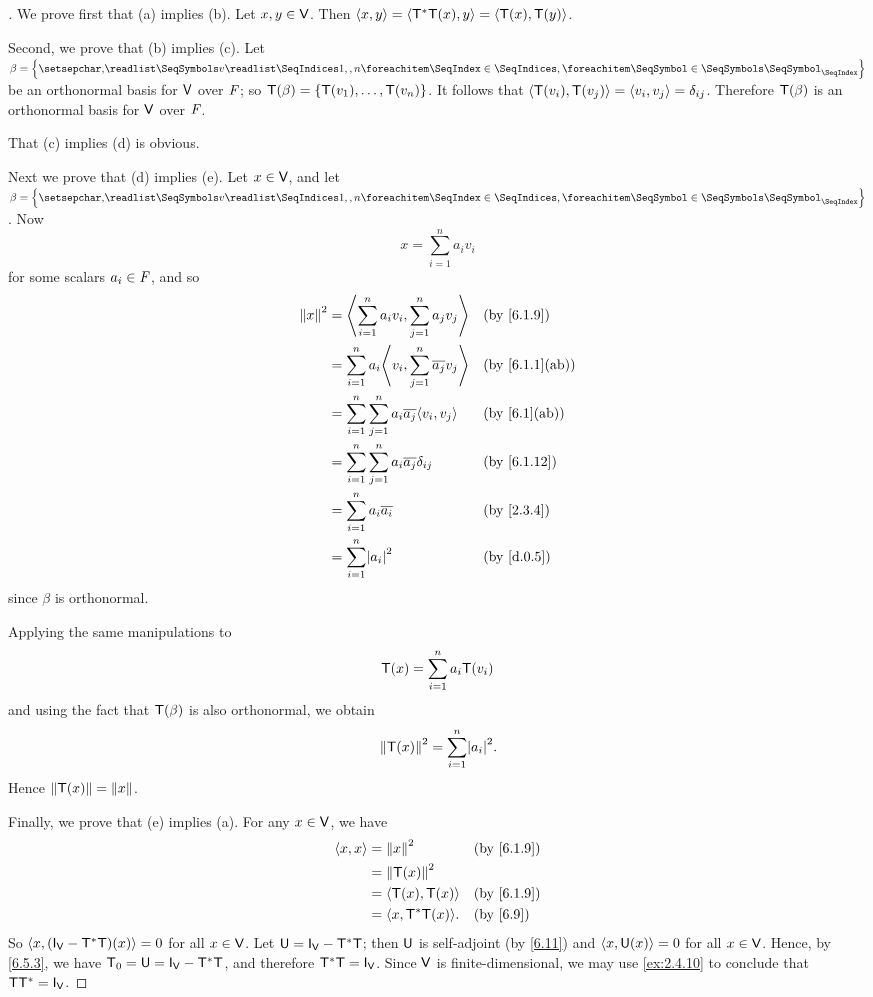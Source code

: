\begin{proof}[]
	We prove first that (a) implies (b).
	Let \(x, y \in \mathsf{V}\).
	Then \(\left\langle x, y\right\rangle = \left\langle\mathsf{T}^* \mathsf{T}(x), y\right\rangle = \left\langle\mathsf{T}(x), \mathsf{T}(y)\right\rangle\).

	Second, we prove that (b) implies (c).
	Let \(\beta = \set{\seq{v}{1,,n}}\) be an orthonormal basis for \(\mathsf{V}\) over \(\mathit{F}\);
	so \(\mathsf{T}(\beta) = \left\lbrace\mathsf{T}(v_1), \dots, \mathsf{T}(v_n)\right\rbrace\).
	It follows that \(\left\langle\mathsf{T}(v_i), \mathsf{T}(v_j)\right\rangle = \left\langle v_i, v_j\right\rangle = \delta_{i j}\).
	Therefore \(\mathsf{T}(\beta)\) is an orthonormal basis for \(\mathsf{V}\) over \(\mathit{F}\).

	That (c) implies (d) is obvious.

	Next we prove that (d) implies (e).
	Let \(x \in \mathsf{V}\), and let \(\beta = \set{\seq{v}{1,,n}}\).
	Now
	\[
		x = \sum_{i = 1}^n a_i v_i
	\]
	for some scalars \(a_i \in \mathit{F}\), and so
	\begin{align*}
		\norm{x}^2 & = \inn{\sum_{i = 1}^n a_i v_i, \sum_{j = 1}^n a_j v_j}         &  & \by{6.1.9}     \\
		           & = \sum_{i = 1}^n  a_i \inn{v_i, \sum_{j = 1}^n \conj{a_j} v_j} &  & \by{6.1.1}[ab] \\
		           & = \sum_{i = 1}^n \sum_{j = 1}^n a_i \conj{a_j} \inn{v_i, v_j}  &  & \by{6.1}[ab]   \\
		           & = \sum_{i = 1}^n \sum_{j = 1}^n a_i \conj{a_j} \delta_{i j}    &  & \by{6.1.12}    \\
		           & = \sum_{i = 1}^n a_i \conj{a_i}                                &  & \by{2.3.4}     \\
		           & = \sum_{i = 1}^n \abs{a_i}^2                                   &  & \by{d.0.5}
	\end{align*}
	since \(\beta\) is orthonormal.

	Applying the same manipulations to
	\[
		\mathsf{T}(x) = \sum_{i = 1}^n a_i \mathsf{T}(v_i)
	\]
	and using the fact that \(\mathsf{T}(\beta)\) is also orthonormal, we obtain
	\[
		\norm{\T(x)}^2 = \sum_{i = 1}^n \abs{a_i}^2.
	\]
	Hence \(\left\lVert\mathsf{T}(x)\right\rVert = \left\lVert x\right\rVert\).

	Finally, we prove that (e) implies (a).
	For any \(x \in \mathsf{V}\), we have
	\begin{align*}
		\inn{x, x} & = \norm{x}^2           &  & \by{6.1.9} \\
		           & = \norm{\T(x)}^2                       \\
		           & = \inn{\T(x), \T(x)}   &  & \by{6.1.9} \\
		           & = \inn{x, \T^* \T(x)}. &  & \by{6.9}
	\end{align*}
	So \(\inn{x, (\IT[\V] - \T^* \T)(x)} = 0\) for all \(x \in \mathsf{V}\).
	Let \(\U = \IT[\V] - \T^* \T\);
	then \(\mathsf{U}\) is self-adjoint (by \cref{6.11}) and \(\left\langle x, \mathsf{U}(x)\right\rangle = 0\) for all \(x \in \mathsf{V}\).
	Hence, by \cref{6.5.3}, we have \(\zT = \U = \IT[\V] - \T^* \T\), and therefore \(\T^* \T = \IT[\V]\).
	Since \(\mathsf{V}\) is finite-dimensional, we may use \cref{ex:2.4.10} to conclude that \(\T \T^* = \IT[\V]\).
\end{proof}

